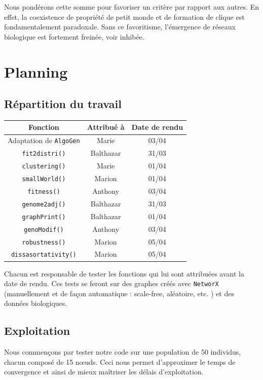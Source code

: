 \medskip
Nous pondérons cette somme pour favoriser un critère par rapport aux autres. En effet, la coexistence de propriété de petit monde et de formation de clique est fondamentalement paradoxale. Sans ce favoritisme, l'émergence de réseaux biologique est fortement freinée, voir inhibée.


\section{Planning}

\subsection{Répartition du travail}

\begin{center}
\begin{table}[!h]
\begin{tabular}{|c|c|c|}
\hline Fonction & Attribué à & Date de rendu \\
\hline
Adaptation de \verb?AlgoGen? & Marie & 03/04 \\
\hline
\verb?fit2distri()? & Balthazar & 31/03 \\
\hline
\verb?clustering()? & Marie & 01/04\\
\hline 
\verb?smallWorld()? & Marion & 01/04\\
\hline
\verb?fitness()? & Anthony & 03/04\\
\hline 
\verb?genome2adj()? & Balthazar & 31/03 \\
\hline 
\verb?graphPrint()? & Balthazar & 01/04 \\
\hline 
\verb?genoModif()? & Anthony & 03/04 \\
\hline 
\verb?robustness()? & Marion & 05/04 \\
\hline 
\verb?dissasortativity()? & Marion & 05/04\\
\hline 
\end{tabular}
\end{table}
\end{center}

Chacun est responsable de tester les fonctions qui lui sont attribuées avant la date de rendu. Ces tests se feront sur des graphes créés avec \verb?NetworX? (manuellement et de façon automatique : scale-free, aléatoire, etc. ) et des données biologiques.

\subsection{Exploitation}
Nous commençons par tester notre code sur une population de 50 individus, chacun composé de 15 nœuds. Ceci nous permet d'approximer le temps de convergence et ainsi de mieux ma\^itriser les délais d'exploitation.

